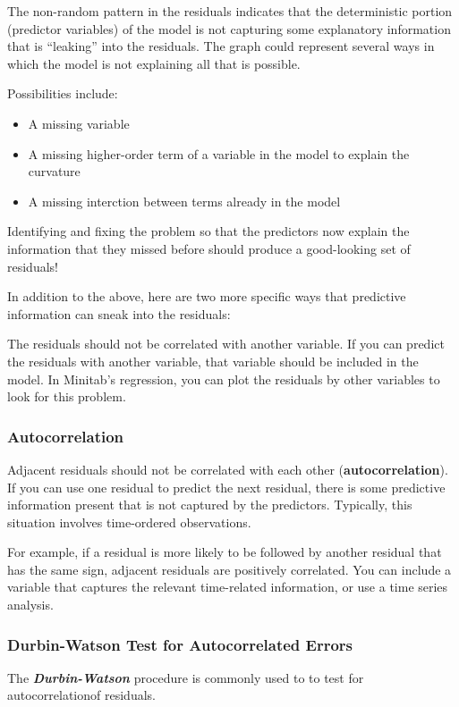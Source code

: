 \documentclass[12pt, a4paper]{article}
\theoremstyle{plain}
\theoremstyle{definition}
\theoremstyle{remark}
\begin{document}
The non-random pattern in the residuals indicates that the deterministic portion (predictor variables) of the model is not capturing some explanatory information that is “leaking” into the residuals. The graph could represent several ways in which the model is not explaining all that is possible. 

Possibilities include:

\begin{itemize}
\item A missing variable
\item A missing higher-order term of a variable in the model to explain the curvature
\item A missing interction between terms already in the model
\end{itemize}


Identifying and fixing the problem so that the predictors now explain the information that they missed before should produce a good-looking set of residuals!

In addition to the above, here are two more specific ways that predictive information can sneak into the residuals:

The residuals should not be correlated with another variable. If you can predict the residuals with another variable, that variable should be included in the model. In Minitab’s regression, you can plot the residuals by other variables to look for this problem.


\subsubsection{Autocorrelation} 
Adjacent residuals should not be correlated with each other (\textbf{autocorrelation}). If you can use one residual to predict the next residual, there is some predictive information present that is not captured by the predictors. Typically, this situation involves time-ordered observations. 

For example, if a residual is more likely to be followed by another residual that has the same sign, adjacent residuals are positively correlated. You can include a variable that captures the relevant time-related information, or use a time series analysis. 

\subsubsection{Durbin-Watson Test for Autocorrelated Errors}
The \textbf{\textit{Durbin-Watson} }procedure is commonly used to to test for autocorrelationof residuals.
\end{document}
